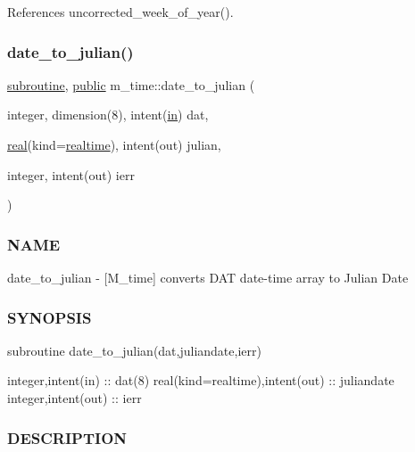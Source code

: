 References uncorrected\+\_\+week\+\_\+of\+\_\+year().

\mbox{\label{namespacem__time_acfdc970b4154b0c15bd33727636e3992}} 
\subsubsection{\texorpdfstring{date\+\_\+to\+\_\+julian()}{date\_to\_julian()}}
{\footnotesize\ttfamily \hyperlink{M__stopwatch_83_8txt_acfbcff50169d691ff02d4a123ed70482}{subroutine}, \hyperlink{M__stopwatch_83_8txt_a2f74811300c361e53b430611a7d1769f}{public} m\+\_\+time\+::date\+\_\+to\+\_\+julian (\begin{DoxyParamCaption}\item[{integer, dimension(8), intent(\hyperlink{M__journal_83_8txt_afce72651d1eed785a2132bee863b2f38}{in})}]{dat,  }\item[{\hyperlink{read__watch_83_8txt_abdb62bde002f38ef75f810d3a905a823}{real}(kind=\hyperlink{namespacem__time_ac10ea9e8d59ec74eaa7d89f2517d7422}{realtime}), intent(out)}]{julian,  }\item[{integer, intent(out)}]{ierr }\end{DoxyParamCaption})}



\subsubsection*{N\+A\+ME}

date\+\_\+to\+\_\+julian -\/ \mbox{[}M\+\_\+time\mbox{]} converts D\+AT date-\/time array to Julian Date 

\subsubsection*{S\+Y\+N\+O\+P\+S\+IS}

\begin{DoxyVerb}subroutine date_to_julian(dat,juliandate,ierr)

 integer,intent(in)               :: dat(8)
 real(kind=realtime),intent(out)  :: juliandate
 integer,intent(out)              :: ierr
\end{DoxyVerb}


\subsubsection*{D\+E\+S\+C\+R\+I\+P\+T\+I\+ON}

